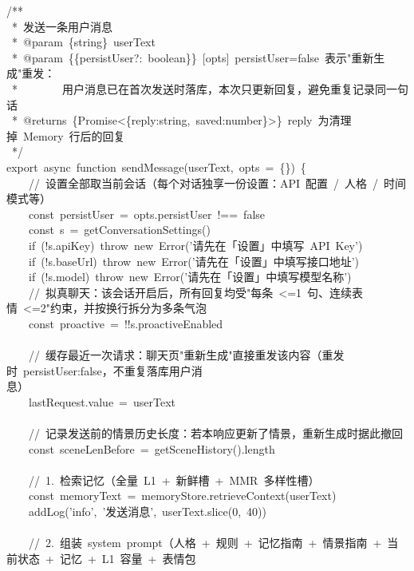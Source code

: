 \documentclass[a4paper,10pt]{article}
\begin{document}
{\ttfamily\footnotesize\raggedright
/**\\
~*~发送一条用户消息\\
~*~@param~\{string\}~userText\\
~*~@param~\{\{persistUser?:~boolean\}\}~[opts]~persistUser=false~表示"重新生成"重发：\\
~*~~~~~~~~用户消息已在首次发送时落库，本次只更新回复，避免重复记录同一句话\\
~*~@returns~\{Promise<\{reply:string,~saved:number\}>\}~reply~为清理掉~Memory~行后的回复\\
~*/\\
export~async~function~sendMessage(userText,~opts~=~\{\})~\{\\
~~~~//~设置全部取当前会话（每个对话独享一份设置：API~配置~/~人格~/~时间模式等）\\
~~~~const~persistUser~=~opts.persistUser~!==~false\\
~~~~const~s~=~getConversationSettings()\\
~~~~if~(!s.apiKey)~throw~new~Error('请先在「设置」中填写~API~Key')\\
~~~~if~(!s.baseUrl)~throw~new~Error('请先在「设置」中填写接口地址')\\
~~~~if~(!s.model)~throw~new~Error('请先在「设置」中填写模型名称')\\
~~~~//~拟真聊天：该会话开启后，所有回复均受"每条~<=1~句、连续表情~<=2"约束，并按换行拆分为多条气泡\\
~~~~const~proactive~=~!!s.proactiveEnabled\\
\mbox{}\\
~~~~//~缓存最近一次请求：聊天页"重新生成"直接重发该内容（重发时~persistUser:false，不重复落库用户消\\
息）\\
~~~~lastRequest.value~=~userText\\
\mbox{}\\
~~~~//~记录发送前的情景历史长度：若本响应更新了情景，重新生成时据此撤回\\
~~~~const~sceneLenBefore~=~getSceneHistory().length\\
\mbox{}\\
~~~~//~1.~检索记忆（全量~L1~+~新鲜槽~+~MMR~多样性槽）\\
~~~~const~memoryText~=~memoryStore.retrieveContext(userText)\\
~~~~addLog('info',~'发送消息',~userText.slice(0,~40))\\
\mbox{}\\
~~~~//~2.~组装~system~prompt（人格~+~规则~+~记忆指南~+~情景指南~+~当前状态~+~记忆~+~L1~容量~+~表情包\\
}
\end{document}
